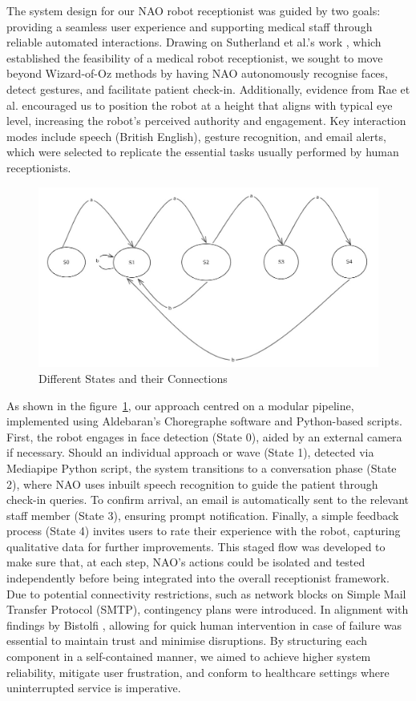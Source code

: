 \documentclass[conference]{IEEEtran}
\begin{document}
The system design for our NAO robot receptionist was guided by two goals: providing a seamless user experience and supporting medical
staff through reliable automated interactions. Drawing on Sutherland et al.’s work \cite{Sutherland2019}, which established the feasibility of a
medical robot receptionist, we sought to move beyond Wizard-of-Oz methods by having NAO autonomously recognise faces, detect gestures, and facilitate 
patient check-in. Additionally, evidence from Rae et al. \cite{Rae2013} encouraged us to position the robot at a height that aligns with typical eye 
level, increasing the robot’s perceived authority and engagement. Key interaction modes include speech (British English), gesture recognition, and 
email alerts, which were selected to replicate the essential tasks usually performed by human receptionists.

\begin{figure}
        \centering
        \includegraphics[width=.6\linewidth]{states.jpg}
        \caption{Different States and their Connections}
        \label{Different states}
\end{figure}

As shown in the figure~\ref{Different states}, our approach centred on a modular pipeline, implemented using Aldebaran’s Choregraphe software and Python-based scripts. 
First, the robot engages 
in face detection (State 0), aided by an external camera if necessary. Should an individual approach or wave (State 1), detected via Mediapipe Python script,
the system transitions to a conversation phase (State 2), where NAO uses inbuilt speech recognition to guide the patient through check-in queries.
To confirm arrival, an email is automatically sent to the relevant staff member (State 3), ensuring prompt notification. 
Finally, a simple feedback process (State 4) invites users to rate their experience with the robot, capturing qualitative data for further improvements.
This staged flow was developed to make sure that, at each step, NAO’s actions could be isolated and tested independently before being integrated into
the overall receptionist framework. Due to potential connectivity restrictions, such as network blocks on Simple Mail Transfer Protocol (SMTP), contingency 
plans were introduced. In alignment with findings by Bistolfi \cite{Bistolfi2022}, allowing for quick human intervention in case of failure was essential 
to maintain trust and minimise disruptions. By structuring each component in a self-contained manner, we aimed to achieve higher system reliability, 
mitigate user frustration, and conform to healthcare settings where uninterrupted service is imperative.
\end{document}
